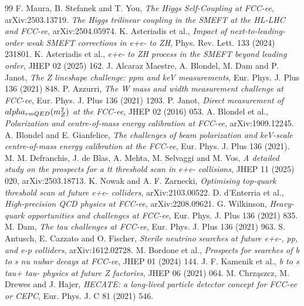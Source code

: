 \documentclass[11pt,a4paper]{article}
\numberwithin{equation}{section}
\begin{document}
\begin{thebibliography}{99}
 F. Maura, B. Stefanek and T. You, \emph{The Higgs Self-Coupling at FCC-ee}, arXiv:2503.13719.
 \emph{The Higgs trilinear coupling in the SMEFT at the HL-LHC and FCC-ee}, arXiv:2504.05974.
 K. Asteriadis et al., \emph{Impact of next-to-leading-order weak SMEFT corrections in e+e- to ZH}, Phys. Rev. Lett. 133 (2024) 231801.
 K. Asteriadis et al., \emph{e+e- to ZH process in the SMEFT beyond leading order}, JHEP 02 (2025) 162.
 J. Alcaraz Maestre, A. Blondel, M. Dam and P. Janot, \emph{The Z lineshape challenge: ppm and keV measurements}, Eur. Phys. J. Plus 136 (2021) 848.
 P. Azzurri, \emph{The W mass and width measurement challenge at FCC-ee}, Eur. Phys. J. Plus 136 (2021) 1203.
 P. Janot, \emph{Direct measurement of $\\alpha_{\\rm QED}(m_Z^2)$ at the FCC-ee}, JHEP 02 (2016) 053.
 A. Blondel et al., \emph{Polarization and centre-of-mass energy calibration at FCC-ee}, arXiv:1909.12245.
 A. Blondel and E. Gianfelice, \emph{The challenges of beam polarization and keV-scale centre-of-mass energy calibration at the FCC-ee}, Eur. Phys. J. Plus 136 (2021).
 M. M. Defranchis, J. de Blas, A. Mehta, M. Selvaggi and M. Vos, \emph{A detailed study on the prospects for a tt threshold scan in e+e- collisions}, JHEP 11 (2025) 020, arXiv:2503.18713.
 K. Nowak and A. F. Zarnecki, \emph{Optimising top-quark threshold scan at future e+e- colliders}, arXiv:2103.00522.
 D. d'Enterria et al., \emph{High-precision QCD physics at FCC-ee}, arXiv:2208.09621.
 G. Wilkinson, \emph{Heavy-quark opportunities and challenges at FCC-ee}, Eur. Phys. J. Plus 136 (2021) 835.
 M. Dam, \emph{The tau challenges at FCC-ee}, Eur. Phys. J. Plus 136 (2021) 963.
 S. Antusch, E. Cazzato and O. Fischer, \emph{Sterile neutrino searches at future e+e-, pp, and e-p colliders}, arXiv:1612.02728.
 M. Bordone et al., \emph{Prospects for searches of b to s nu nubar decays at FCC-ee}, JHEP 01 (2024) 144.
 J. F. Kamenik et al., \emph{b to s tau+ tau- physics at future Z factories}, JHEP 06 (2021) 064.
 M. Chrz\k{a}szcz, M. Drewes and J. Hajer, \emph{HECATE: a long-lived particle detector concept for FCC-ee or CEPC}, Eur. Phys. J. C 81 (2021) 546.

\end{thebibliography}
\end{document}
